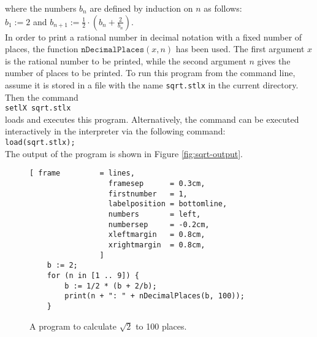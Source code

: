 where the numbers $b_n$ are defined by induction on $n$  as follows:
\\[0.2cm]
\hspace*{1.3cm}
$b_1 := 2$ \quad and \quad $\displaystyle b_{n+1} := \frac{1}{2} \cdot \left(b_n + \frac{2}{b_n}\right)$.
\\[0.2cm]
In order to print a rational number in decimal notation with a fixed number of places, the function
$\texttt{nDecimalPlaces}(x,n)$ has been used.  The first argument $x$ is the rational number to be
printed, while the second argument $n$ gives the number of places to be printed.  To run this
program from the command line, assume it is stored in a file with the name \texttt{sqrt.stlx} in the
current directory.  Then the command
\\[0.2cm]
\hspace*{1.3cm}
\texttt{setlX sqrt.stlx}
\\[0.2cm]
loads and executes this program.  Alternatively, the command can be executed interactively in the
interpreter via the following command:
\\[0.2cm]
\hspace*{1.3cm}
\texttt{load(sqrt.stlx);}
\\[0.2cm]
The output of the program is shown in Figure \ref{fig:sqrt-output}.

\begin{figure}[!ht]
\centering
\begin{Verbatim}[ frame         = lines, 
                  framesep      = 0.3cm, 
                  firstnumber   = 1,
                  labelposition = bottomline,
                  numbers       = left,
                  numbersep     = -0.2cm,
                  xleftmargin   = 0.8cm,
                  xrightmargin  = 0.8cm,
                ]
    b := 2;
    for (n in [1 .. 9]) {
        b := 1/2 * (b + 2/b);
        print(n + ": " + nDecimalPlaces(b, 100));
    }
\end{Verbatim}
\vspace*{-0.3cm}
\caption{A program to calculate $\sqrt{2}$ to 100 places.}
\label{fig:sqrt.stlx}
\end{figure}


